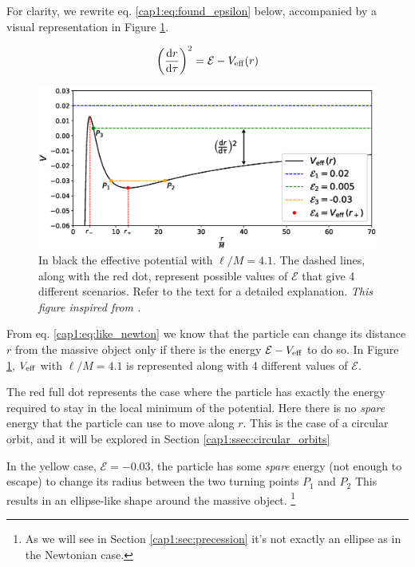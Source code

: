 For clarity, we rewrite eq. \ref{cap1:eq:found_epsilon} below, accompanied by a
visual representation in Figure \ref{cap1:fig:V_eff_orbits}.

\begin{equation}
    \left( \dv{r}{\tau} \right)^2 = \mathcal E - V_{\rm eff} (r)
    \label{cap1:eq:like_newton}
\end{equation}

\begin{figure}[h]
    \centering
    \includegraphics[width = \textwidth]{Figures/V_eff_orbits.eps}
    \caption{In black the effective potential with $\ell / M = 4.1$.
    The dashed lines, along with the red dot, represent possible values of
    $\mathcal E$ that give 4 different scenarios.
    Refer to the text for a detailed explanation. 
    \textit{This figure inspired from
    \cite[page 245, Figure 12.2]{shapiro2008black}.}}
    \label{cap1:fig:V_eff_orbits}
\end{figure}

From eq. \ref{cap1:eq:like_newton} we know that the particle can change its
distance $r$ from the massive object only if there is the energy
$\mathcal E - V_{\rm eff}$ to do so.
In Figure \ref{cap1:fig:V_eff_orbits}, $V_{\rm eff}$ with $\ell / M = 4.1$ is
represented along with 4 different values of $\mathcal E$.

The red full dot represents the case where the particle has exactly the energy
required to stay in the local minimum of the potential.
Here there is no \textit{spare} energy that the particle can use to move along
$r$.
This is the case of a circular orbit, and it will be explored in Section
\ref{cap1:ssec:circular_orbits}

In the yellow case, $\mathcal E = -0.03$, the particle has some \textit{spare}
energy (not enough to escape) to change its radius between the two turning
points $P_1$ and $P_2$
This results in an ellipse-like shape around the massive object.
\footnote{As we will see in Section \ref{cap1:sec:precession} it's not
exactly an ellipse as in the Newtonian case.}

